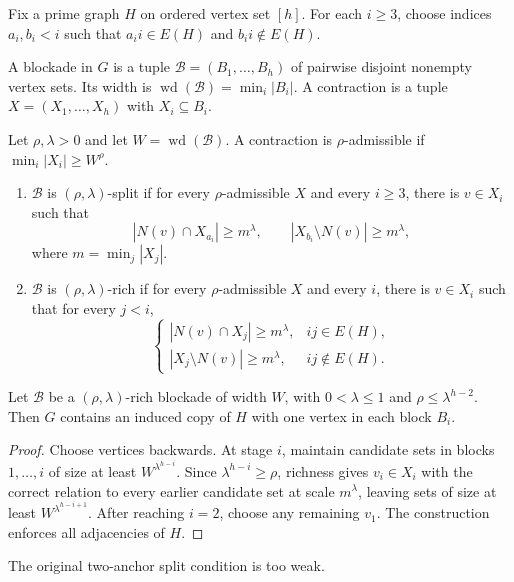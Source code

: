 Fix a prime graph $H$ on ordered vertex set $[h]$. For each $i\ge 3$, choose indices $a_i,b_i<i$ such that $a_i i\in E(H)$ and $b_i i\notin E(H)$.

\begin{definition}
A blockade in $G$ is a tuple $\mathcal B=(B_1,\dots,B_h)$ of pairwise disjoint nonempty vertex sets. Its width is $\operatorname{wd}(\mathcal B)=\min_i |B_i|$. A contraction is a tuple $X=(X_1,\dots,X_h)$ with $X_i\subseteq B_i$.

Let $\rho,\lambda>0$ and let $W=\operatorname{wd}(\mathcal B)$. A contraction is $\rho$-admissible if $\min_i |X_i|\ge W^\rho$.
\begin{enumerate}[label=(\alph*)]
\item $\mathcal B$ is $(\rho,\lambda)$-split if for every $\rho$-admissible $X$ and every $i\ge 3$, there is $v\in X_i$ such that
\[
  |N(v)\cap X_{a_i}|\ge m^\lambda,
  \qquad |X_{b_i}\setminus N(v)|\ge m^\lambda,
\]
where $m=\min_j |X_j|$.
\item $\mathcal B$ is $(\rho,\lambda)$-rich if for every $\rho$-admissible $X$ and every $i$, there is $v\in X_i$ such that for every $j<i$,
\[
  \begin{cases}
  |N(v)\cap X_j|\ge m^\lambda, & ij\in E(H),\\
  |X_j\setminus N(v)|\ge m^\lambda, & ij\notin E(H).
  \end{cases}
\]
\end{enumerate}
\end{definition}

\begin{proposition}\label{prop:rich-transversal}
Let $\mathcal B$ be a $(\rho,\lambda)$-rich blockade of width $W$, with $0<\lambda\le 1$ and $\rho\le \lambda^{h-2}$. Then $G$ contains an induced copy of $H$ with one vertex in each block $B_i$.
\end{proposition}

\begin{proof}
Choose vertices backwards. At stage $i$, maintain candidate sets in blocks $1,\dots,i$ of size at least $W^{\lambda^{h-i}}$. Since $\lambda^{h-i}\ge\rho$, richness gives $v_i\in X_i$ with the correct relation to every earlier candidate set at scale $m^\lambda$, leaving sets of size at least $W^{\lambda^{h-i+1}}$. After reaching $i=2$, choose any remaining $v_1$. The construction enforces all adjacencies of $H$.
\end{proof}

The original two-anchor split condition is too weak.

